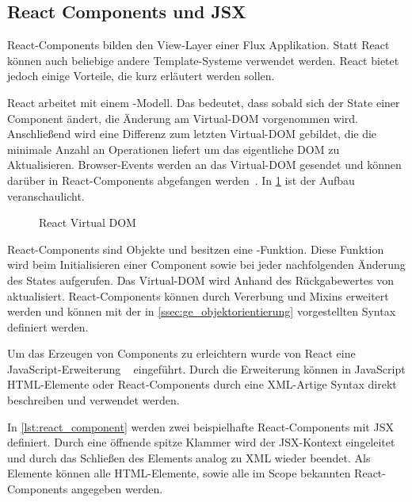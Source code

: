 \subsection{React Components und JSX}
\label{ssec:gf_react_components_und_jsx}

React-Components bilden den View-Layer einer Flux Applikation.  Statt React
können auch beliebige andere Template-Systeme verwendet werden.  React bietet
jedoch einige Vorteile, die kurz erläutert werden sollen.

React arbeitet mit einem -Modell.  Das bedeutet,
dass sobald sich der State einer Component ändert, die Änderung am Virtual-DOM
vorgenommen wird.  Anschließend wird eine Differenz zum letzten Virtual-DOM
gebildet, die die minimale Anzahl an Operationen liefert um das eigentliche DOM
zu Aktualisieren.  Browser-Events werden an das Virtual-DOM gesendet und können
darüber in React-Components abgefangen werden~\cite{ReactDemystified}.
In \cref{fig:react_virtual_dom} ist der Aufbau veranschaulicht.

\begin{figure}
    \centering
    
    \caption{React Virtual DOM}
    \label{fig:react_virtual_dom}
\end{figure}

React-Components sind Objekte und besitzen eine -Funktion.  Diese
Funktion wird beim Initialisieren einer Component sowie bei jeder nachfolgenden
Änderung des States aufgerufen.  Das Virtual-DOM wird Anhand des Rückgabewertes
von  aktualisiert.  React-Components können durch Vererbung und
Mixins erweitert werden und können mit der in
\cref{ssec:ge_objektorientierung} vorgestellten Syntax definiert werden.

Um das Erzeugen von Components zu erleichtern wurde von React eine
JavaScript-Erweiterung ~\cite{JSX} eingeführt.  Durch die
Erweiterung können in JavaScript HTML-Elemente oder React-Components durch
eine XML-Artige Syntax direkt beschreiben und verwendet werden.

In \cref{lst:react_component} werden zwei beispielhafte React-Components mit JSX
definiert.  Durch eine öffnende spitze Klammer wird der JSX-Kontext eingeleitet
und durch das Schließen des Elements analog zu XML wieder beendet.  Als Elemente
können alle HTML-Elemente, sowie alle im Scope bekannten React-Components
angegeben werden.



